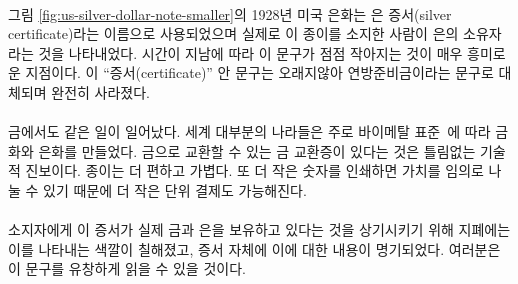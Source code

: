\paragraph{}
\begin{comment}
	Note that the 1928 U.S. silver dollar in
	Figure~\ref{fig:us-silver-dollar-note-smaller} still goes by the name of
	\textit{silver certificate}, indicating that this is indeed simply a document
	stating that the bearer of this piece of paper is owed a piece of silver. It is
	interesting to see that the text which indicates this got smaller over time. The
	trace of \enquote{certificate} vanished completely after a while, being replaced
	by the reassuring statement that these are federal reserve notes.
\end{comment}
그림 \ref{fig:us-silver-dollar-note-smaller}의 1928년 미국 은화는 은 증서(silver certificate)라는
이름으로 사용되었으며 실제로 이 종이를 소지한 사람이 은의 소유자라는 것을 나타내었다. 
시간이 지남에 따라 이 문구가 점점 작아지는 것이 매우 흥미로운 지점이다. 
이 \enquote{증서(certificate)} 안 문구는 오래지않아 연방준비금이라는 문구로 대체되며 완전히 사라졌다.

\paragraph{}
\begin{comment}
	As mentioned above, the same thing happened to gold. Most of the world was on a
	bimetallic standard~\cite{wiki:bimetallism}, meaning coins were made
	primarily of gold and silver. Having certificates for gold, redeemable in gold
	coins, was arguably a technological improvement. Paper is more convenient,
	lighter, and since it can be divided arbitrarily by simply printing a smaller
	number on it, it is easier to break into smaller units.
\end{comment}
금에서도 같은 일이 일어났다. 
세계 대부분의 나라들은 주로 바이메탈 표준~\cite{wiki:bimetallism}에 따라 금화와 은화를 만들었다. 
금으로 교환할 수 있는 금 교환증이 있다는 것은 틀림없는 기술적 진보이다.
종이는 더 편하고 가볍다. 또 더 작은 숫자를 인쇄하면 가치를 임의로 나눌 수 있기 때문에 더 작은 단위 결제도 가능해진다.

\paragraph{}
\begin{comment}
	To remind the bearers (users) that these certificates were
	representative for actual gold and silver, they were colored accordingly
	and stated this clearly on the certificate itself. You can fluently read
	the writing from top to bottom:
\end{comment}
소지자에게 이 증서가 실제 금과 은을 보유하고 있다는 것을 상기시키기 위해 지폐에는 이를 나타내는 색깔이 칠해졌고, 
증서 자체에 이에 대한 내용이 명기되었다. 여러분은 이 문구를 유창하게 읽을 수 있을 것이다.

